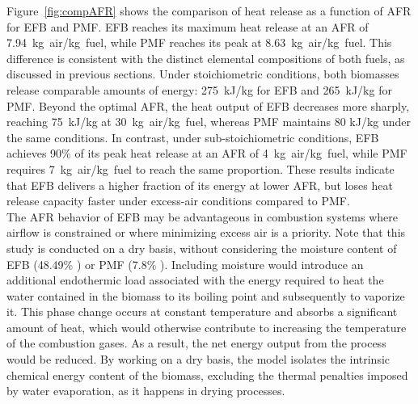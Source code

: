 \documentclass[preprint,12pt]{elsarticle}
\begin{document}
Figure~\ref{fig:compAFR} shows the comparison of heat release as a function of AFR for EFB and PMF. EFB reaches its maximum heat release at an AFR of 7.94~kg~air/kg~fuel, while PMF reaches its peak at 8.63~kg~air/kg~fuel. This difference is consistent with the distinct elemental compositions of both fuels, as discussed in previous sections. Under stoichiometric conditions, both biomasses release comparable amounts of energy: 275~kJ/kg for EFB and 265~kJ/kg for PMF. Beyond the optimal AFR, the heat output of EFB decreases more sharply, reaching 75~kJ/kg at 30~kg~air/kg~fuel, whereas PMF maintains 80 kJ/kg under the same conditions. In contrast, under sub-stoichiometric conditions, EFB achieves 90\% of its peak heat release at an AFR of 4~kg~air/kg~fuel, while PMF requires 7~kg~air/kg~fuel to reach the same proportion.  These results indicate that EFB delivers a higher fraction of its energy at lower AFR, but loses heat release capacity faster under excess-air conditions compared to PMF.\\

The AFR behavior of EFB may be advantageous in combustion systems where airflow is constrained or where minimizing excess air is a priority. Note that this study is conducted on a dry basis, without considering the moisture content of EFB (48.49\% \cite{BayonaRaquis}) or PMF (7.8\% \cite{Pereira2020}). Including moisture would introduce an additional endothermic load associated with the energy required to heat the water contained in the biomass to its boiling point and subsequently to vaporize it. This phase change occurs at constant temperature and absorbs a significant amount of heat, which would otherwise contribute to increasing the temperature of the combustion gases. As a result, the net energy output from the process would be reduced. By working on a dry basis, the model isolates the intrinsic chemical energy content of the biomass, excluding the thermal penalties imposed by water evaporation, as it happens in drying processes. \\

\end{document}
